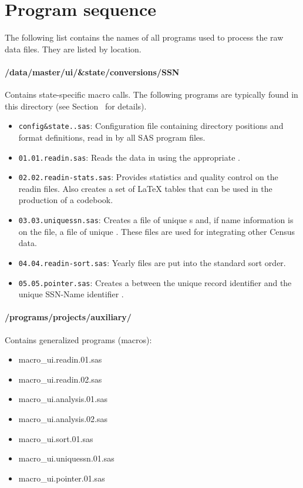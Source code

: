 \section{Program sequence\label{app:ui_programs}}

The following list contains the names of all programs used to process the raw
data files. They are listed by location.


\paragraph{/data/master/ui/\&state/conversions/SSN}
 Contains state-specific macro calls. The following programs are typically
 found in this directory (see Section~ for details).

\begin{itemize}                                %
\item {\tt config\&state..sas}: Configuration file containing directory positions 
  and format definitions, read in by all SAS program files.
\item {\tt 01.01.readin.sas}: Reads the data in using the appropriate .
\item {\tt 02.02.readin-stats.sas}: Provides statistics and quality control on
  the readin files. Also creates a set of \LaTeX{} tables that can be used in
  the production of a codebook.
\item {\tt 03.03.uniquessn.sas}: Creates a file of unique s
  and, if name information is on the file, a file of unique
  . These files are used for integrating
  other Census data.
\item {\tt 04.04.readin-sort.sas}: Yearly files are put into the standard
  sort order.
\item {\tt 05.05.pointer.sas}: Creates a  between the
  unique record identifier  and the unique SSN-Name identifier
  .
\end{itemize}                                  %


\paragraph{/programs/projects/auxiliary/}

Contains generalized programs (macros):

\begin{itemize}
\item macro\_ui.readin.01.sas
\item macro\_ui.readin.02.sas
\item macro\_ui.analysis.01.sas
\item macro\_ui.analysis.02.sas
\item macro\_ui.sort.01.sas
\item macro\_ui.uniquessn.01.sas
\item macro\_ui.pointer.01.sas
\end{itemize}


